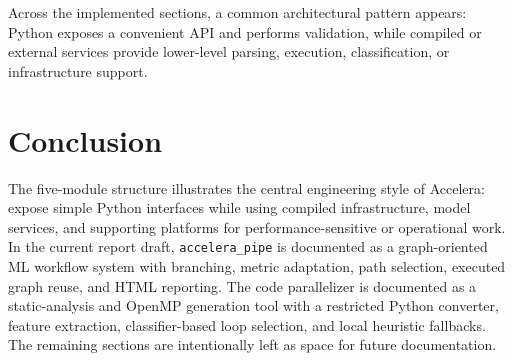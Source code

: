 \documentclass[11pt,a4paper]{article}
\newcommand{\project}{Accelera}
\begin{document}
Across the implemented sections, a common architectural pattern appears:
Python exposes a convenient API and performs validation, while compiled or
external services provide lower-level parsing, execution, classification, or
infrastructure support.

\section{Conclusion}

The five-module structure illustrates the central engineering style of
\project{}: expose simple Python interfaces while using compiled
infrastructure, model services, and supporting platforms for
performance-sensitive or operational work. In the current report draft,
\texttt{accelera\_pipe} is documented as a graph-oriented ML workflow system
with branching, metric adaptation, path selection, executed graph reuse, and
HTML reporting. The code parallelizer is documented as a static-analysis and
OpenMP generation tool with a restricted Python converter, feature extraction,
classifier-based loop selection, and local heuristic fallbacks. The remaining
sections are intentionally left as space for future documentation.
\end{document}
